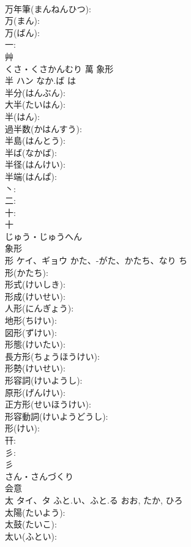 \documentclass[8pt]{extreport}
\begin{document}
\begin{CJK}{UTF8}{min}
\\	万年筆(まんねんひつ): 
\\	万(まん): 
\\	万(ばん): 
\\	一: 
\\	艸	
\\	くさ・くさかんむり	萬	象形 
\\	半	ハン	なか.ば	は	
\\	半分(はんぶん): 
\\	大半(たいはん): 
\\	半(はん): 
\\	過半数(かはんすう): 
\\	半島(はんとう): 
\\	半ば(なかば): 
\\	半径(はんけい): 
\\	半端(はんぱ): 
\\	丶: 
\\	二: 
\\	十: 
\\	十	
\\	じゅう・じゅうへん	
\\	象形 
\\	形	ケイ、ギョウ	かた、-がた、かたち、なり	ち	
\\	形(かたち): 
\\	形式(けいしき): 
\\	形成(けいせい): 
\\	人形(にんぎょう): 
\\	地形(ちけい): 
\\	図形(ずけい): 
\\	形態(けいたい): 
\\	長方形(ちょうほうけい): 
\\	形勢(けいせい): 
\\	形容詞(けいようし): 
\\	原形(げんけい): 
\\	正方形(せいほうけい): 
\\	形容動詞(けいようどうし): 
\\	形(けい): 
\\	幵: 
\\	彡: 
\\	彡	
\\	さん・さんづくり	
\\	会意 
\\	太	タイ、タ	ふと.い、ふと.る	おお, たか, ひろ	
\\	太陽(たいよう): 
\\	太鼓(たいこ): 
\\	太い(ふとい): 

\end{CJK}
\end{document}
